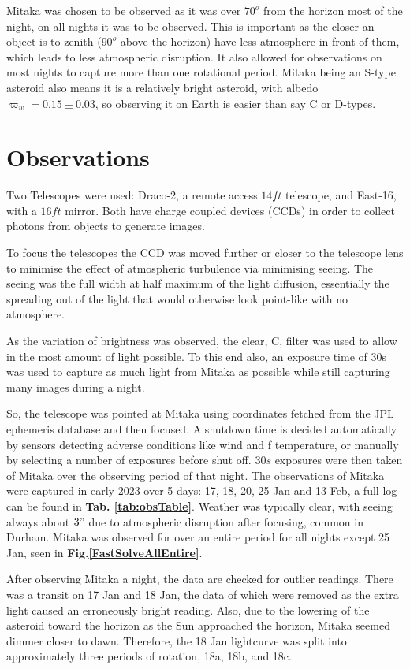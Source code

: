 \documentclass[10pt,twocolumn]{revtex4}    %
\newcommand{\reffig}[1]{\textbf{Fig.#1}}
\begin{document}
Mitaka was chosen to be observed as it was over $70^o$ from the horizon most of the night, on all nights it was to be observed. This is important as the closer an object is to zenith ($90^o$ above the horizon) have less atmosphere in front of them, which leads to less atmospheric disruption. It also allowed for observations on most nights to capture more than one rotational period. Mitaka being an S-type asteroid also means it is a relatively bright asteroid, with albedo $\varpi_w = 0.15 \pm 0.03$, so observing it on Earth is easier than say C or D-types.


\section{Observations} 
Two Telescopes were used: Draco-2, a remote access $14ft$ telescope, and East-16, with a $16ft$ mirror. Both have charge coupled devices (CCDs) in order to collect photons from objects to generate images. 

To focus the telescopes the CCD was moved further or closer to the telescope lens to minimise the effect of atmospheric turbulence via minimising seeing. The seeing was the full width at half maximum of the light diffusion, essentially the spreading out of the light that would otherwise look point-like with no atmosphere.

As the variation of brightness was observed, the clear, C, filter was used to allow in the most amount of light possible. To this end also, an exposure time of 30s was used to capture as much light from Mitaka as possible while still capturing many images during a night. 

So, the telescope was pointed at Mitaka using coordinates fetched from the JPL ephemeris database and then focused. A shutdown time is decided automatically by sensors detecting adverse conditions like wind and f temperature, or manually by selecting a number of exposures before shut off. $30s$ exposures were then taken of Mitaka over the observing period of that night. The observations of Mitaka were captured in early 2023 over 5 days: 17, 18, 20, 25 Jan and 13 Feb, a full log can be found in \textbf{Tab. \ref{tab:obsTable}}. Weather was typically clear, with seeing always about $3"$ due to atmospheric disruption after focusing, common in Durham. Mitaka was observed for over an entire period for all nights except 25 Jan, seen in \reffig{\ref{FastSolveAllEntire}}.

After observing Mitaka a night, the data are checked for outlier readings. There was a transit on 17 Jan and 18 Jan, the data of which were removed as the extra light caused an erroneously bright reading. Also, due to the lowering of the asteroid toward the horizon as the Sun approached the horizon, Mitaka seemed dimmer closer to dawn. Therefore, the 18 Jan lightcurve was split into approximately three periods of rotation, 18a, 18b, and 18c.
\end{document}
